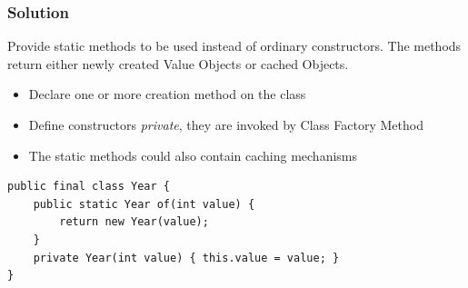 \subsubsection{Solution}
Provide static methods to be used instead of ordinary constructors. The methods return either newly created Value Objects or cached Objects.
\begin{itemize}
    \item Declare one or more creation method on the class
    \item Define constructors \textit{private}, they are invoked by Class Factory Method
    \item The static methods could also contain caching mechanisms
\end{itemize}
\begin{lstlisting}
public final class Year {
    public static Year of(int value) {
        return new Year(value);
    }
    private Year(int value) { this.value = value; }
}
\end{lstlisting}